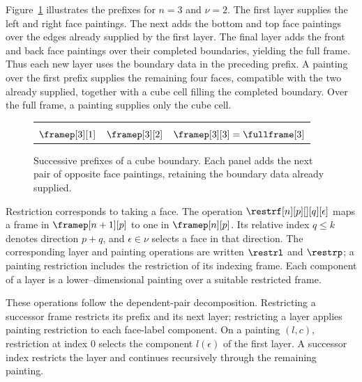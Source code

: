 \documentclass[a4paper,UKenglish,cleveref,autoref]{lipics-v2021}
\begin{document}
Figure~\ref{fig:cube-prefixes} illustrates the prefixes for $n=3$ and $\nu=2$. The first layer supplies the left and right face paintings. The next adds the bottom and top face paintings over the edges already supplied by the first layer. The final layer adds the front and back face paintings over their completed boundaries, yielding the full frame. Thus each new layer uses the boundary data in the preceding prefix. A painting over the first prefix supplies the remaining four faces, compatible with the two already supplied, together with a cube cell filling the completed boundary. Over the full frame, a painting supplies only the cube cell.

\begin{figure}[tbp]
  \centering
  \begingroup
  
  \begin{tabularx}{\linewidth}{YYY}
    \cubePicture{\cubeLastLayerFirst}                     &
    \cubePicture{\cubeLastLayerFirst\cubeLastLayerSecond} &
    \cubePicture{\cubeLastLayerFirst\cubeLastLayerSecond\cubeLastLayerThird}                                \\\addlinespace[0.6em]
    $\framep[3][1]$                                       & $\framep[3][2]$ & $\framep[3][3]=\fullframe[3]$
  \end{tabularx}
  \endgroup
  \caption{Successive prefixes of a cube boundary. Each panel adds the next pair of opposite face paintings, retaining the boundary data already supplied.}
  \label{fig:cube-prefixes}
\end{figure}

Restriction corresponds to taking a face. The operation $\restrf[n][p][][q][\epsilon]$ maps a frame in $\framep[n+1][p]$ to one in $\framep[n][p]$. Its relative index $q\leq k$ denotes direction $p+q$, and $\epsilon\in\nu$ selects a face in that direction. The corresponding layer and painting operations are written $\restrl$ and $\restrp$; a painting restriction includes the restriction of its indexing frame. Each component of a layer is a lower--dimensional painting over a suitable restricted frame.

These operations follow the dependent-pair decomposition. Restricting a successor frame restricts its prefix and its next layer; restricting a layer applies painting restriction to each face-label component. On a painting $(l,c)$, restriction at index $0$ selects the component $l(\epsilon)$ of the first layer. A successor index restricts the layer and continues recursively through the remaining painting.
\end{document}
